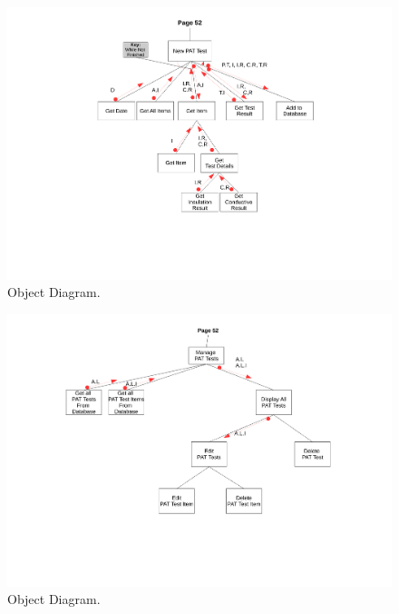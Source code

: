 \begin{landscape}
\newpage

\begin{figure}[H]
    \begin{center}
    \includegraphics[width=500px]{./Design/top_down_design/new_pat_test}
    \caption{Object Diagram.} \label{fig:object_diagram}
    \end{center}
\end{figure}

\newpage

\begin{figure}[H]
    \begin{center}
    \includegraphics[width=500px]{./Design/top_down_design/manage_pat_tests.pdf}
    \caption{Object Diagram.} \label{fig:object_diagram}
    \end{center}
\end{figure}


\end{landscape}


